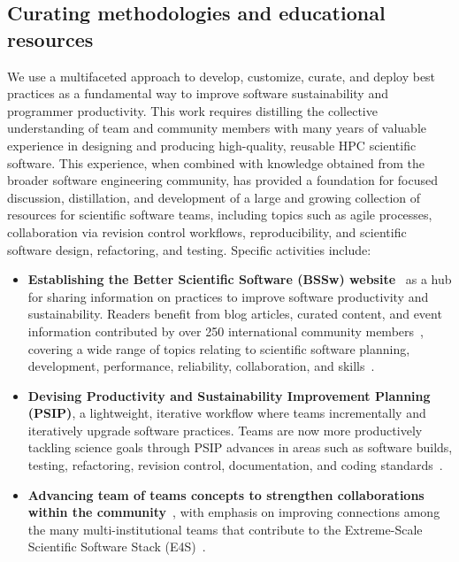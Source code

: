 \subsection*{Curating methodologies and educational resources}
We use a multifaceted approach to develop, customize, curate, and deploy best practices as a fundamental way to improve software sustainability and programmer productivity. This work requires distilling the collective understanding of team and community members with many years of valuable experience in designing and producing high-quality, reusable HPC scientific software.  This experience, when combined with knowledge obtained from the broader software engineering community, has provided a foundation for focused discussion, distillation, and development of a large and growing collection of resources for scientific software teams, including topics such as agile processes, collaboration via revision control workflows, reproducibility, and scientific software design, refactoring, and testing. 
Specific activities include:
\begin{itemize}
\item {\bf Establishing the Better Scientific Software (BSSw) website}~\cite{www:bssw.io} as a hub for sharing information on practices to improve software productivity and sustainability. Readers benefit from blog articles, curated content, and event information contributed by over 250 international community members~\cite{www:bssw.io-contributors}, covering a wide range of topics relating to scientific software planning, development, performance, reliability, collaboration, and skills~\cite{www:bssw.io-year-in-review2021,www:bssw.io-year-in-review2020,www:bssw.io-year-in-review2019}.
\item {\bf Devising Productivity and Sustainability Improvement Planning (PSIP)}, a light\-weight, iterative workflow where teams incrementally and iteratively upgrade software practices\cite{Heroux:2020:LSP,osti_1884442}. Teams are now more productively tackling science goals through PSIP advances in areas such as software builds, testing, refactoring, revision control, documentation, and coding standards~\cite{zamora-psip-bssw-blog2018,dubey-psip-bssw-blog2019,hdf5-psip-bssw-blog2020}. 
\item {\bf Advancing team of teams concepts to strengthen collaborations within the community}~\cite{osti_1881691,TeamOfTeams,10.1007/978-3-030-22338-0_39}, with emphasis on improving connections among the many multi-institutional teams that contribute to the Extreme-Scale Scientific Software Stack (E4S)~\cite{e4s-webpage}.
\end{itemize}


